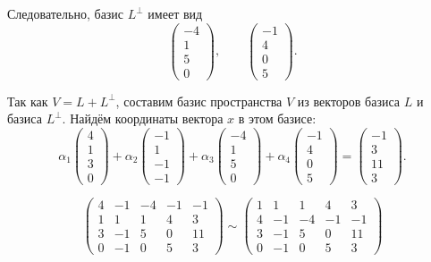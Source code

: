 Следовательно, базис $L^\perp$ имеет вид
\[
\begin{pmatrix}
-4\\
1\\
5\\
0
\end{pmatrix},
\qquad
\begin{pmatrix}
-1\\
4\\
0\\
5
\end{pmatrix}.
\]

Так как $V=L+L^\perp$, составим базис пространства $V$ из векторов базиса $L$ и базиса $L^\perp$.
Найдём координаты вектора $x$ в этом базисе:
\[
\alpha_1
\begin{pmatrix}
4\\
1\\
3\\
0
\end{pmatrix}
+
\alpha_2
\begin{pmatrix}
-1\\
1\\
-1\\
-1
\end{pmatrix}
+
\alpha_3
\begin{pmatrix}
-4\\
1\\
5\\
0
\end{pmatrix}
+
\alpha_4
\begin{pmatrix}
-1\\
4\\
0\\
5
\end{pmatrix}
=
\begin{pmatrix}
-1\\
3\\
11\\
3
\end{pmatrix}.
\]

\[
\left(
\begin{array}{cccc|c}
4 & -1 & -4 & -1 & -1\\
1 & 1 & 1 & 4 & 3\\
3 & -1 & 5 & 0 & 11\\
0 & -1 & 0 & 5 & 3
\end{array}
\right)
\sim
\left(
\begin{array}{cccc|c}
1 & 1 & 1 & 4 & 3\\
4 & -1 & -4 & -1 & -1\\
3 & -1 & 5 & 0 & 11\\
0 & -1 & 0 & 5 & 3
\end{array}
\right)
\]

